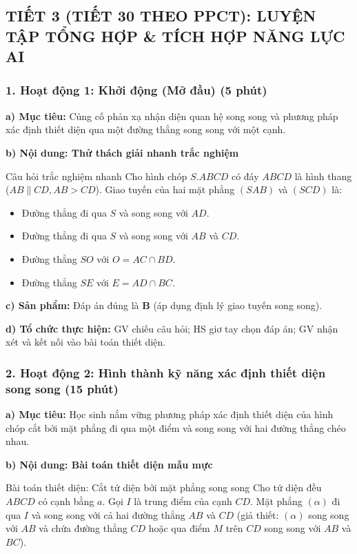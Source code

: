 \documentclass[12pt, a4paper]{article}
\begin{document}
\subsection*{TIẾT 3 (TIẾT 30 THEO PPCT): LUYỆN TẬP TỔNG HỢP \& TÍCH HỢP NĂNG LỰC AI}

\subsubsection*{1. Hoạt động 1: Khởi động (Mở đầu) (5 phút)}

\noindent \textbf{a) Mục tiêu:}
Củng cố phản xạ nhận diện quan hệ song song và phương pháp xác định thiết diện qua một đường thẳng song song với một cạnh.

\noindent \textbf{b) Nội dung: Thử thách giải nhanh trắc nghiệm}
\begin{pedabox}{Câu hỏi trắc nghiệm nhanh}
Cho hình chóp $S.ABCD$ có đáy $ABCD$ là hình thang ($AB \parallel CD, AB > CD$). Giao tuyến của hai mặt phẳng $(SAB)$ và $(SCD)$ là:
\begin{itemize}[leftmargin=0.6cm]
    \item[A.] Đường thẳng đi qua $S$ và song song với $AD$.
    \item[\textbf{B.}] Đường thẳng đi qua $S$ và song song với $AB$ và $CD$.
    \item[C.] Đường thẳng $SO$ với $O = AC \cap BD$.
    \item[D.] Đường thẳng $SE$ với $E = AD \cap BC$.
\end{itemize}
\end{pedabox}

\noindent \textbf{c) Sản phẩm:} Đáp án đúng là \textbf{B} (áp dụng định lý giao tuyến song song).

\noindent \textbf{d) Tổ chức thực hiện:}
GV chiếu câu hỏi; HS giơ tay chọn đáp án; GV nhận xét và kết nối vào bài toán thiết diện.

\subsubsection*{2. Hoạt động 2: Hình thành kỹ năng xác định thiết diện song song (15 phút)}

\noindent \textbf{a) Mục tiêu:}
Học sinh nắm vững phương pháp xác định thiết diện của hình chóp cắt bởi mặt phẳng đi qua một điểm và song song với hai đường thẳng chéo nhau.

\noindent \textbf{b) Nội dung: Bài toán thiết diện mẫu mực}
\begin{pedabox}{Bài toán thiết diện: Cắt tứ diện bởi mặt phẳng song song}
Cho tứ diện đều $ABCD$ có cạnh bằng $a$. Gọi $I$ là trung điểm của cạnh $CD$. Mặt phẳng $(\alpha)$ đi qua $I$ và song song với cả hai đường thẳng $AB$ và $CD$ (giả thiết: $(\alpha)$ song song với $AB$ và chứa đường thẳng $CD$ hoặc qua điểm $M$ trên $CD$ song song với $AB$ và $BC$).
\end{pedabox}
\end{document}
